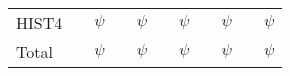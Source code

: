 \begin{table*}
\begin{tabular}{l r@{ + }l<{$\psi$} r@{ + }l<{$\psi$} r@{ + }l<{$\psi$} r@{ + }l<{$\psi$} r@{ + }l<{$\psi$}}
        HIST4   & \HTwoACodingInHISTFour{}    & \HTwoAPseudoInHISTFour{}
                & \HTwoBCodingInHISTFour{}    & \HTwoBPseudoInHISTFour{}
                & \HThreeCodingInHISTFour{}   & \HThreePseudoInHISTFour{}
                & \HFourCodingInHISTFour{}    & \HFourPseudoInHISTFour{}
                & \CodingGenesInHISTFour{}  & \PseudoGenesInHISTFour{} \\
        \addlinespace
        Total   & \HTwoACodingGenes{}       & \HTwoAPseudoGenes{}
                & \HTwoBCodingGenes{}       & \HTwoBPseudoGenes{}
                & \HThreeCodingGenes{}      & \HThreePseudoGenes{}
                & \HFourCodingGenes{}       & \HFourPseudoGenes{}
                & \TotalCodingGenes{}       & \TotalPseudoGenes{} \\
        \bottomrule
      \end{tabular}
    \end{table*}

